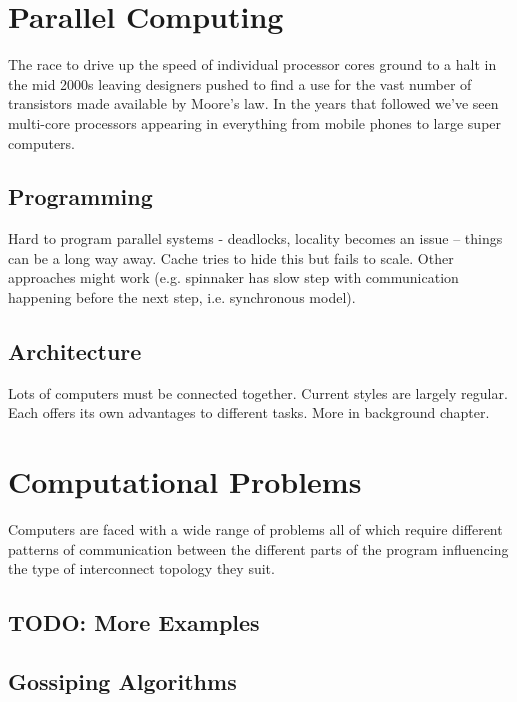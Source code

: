 	\section{Parallel Computing}
		
		The race to drive up the speed of individual processor cores ground to a
		halt in the mid 2000s leaving designers pushed to find a use for the vast
		number of transistors made available by Moore's law. In the years that
		followed we've seen multi-core processors appearing in everything from
		mobile phones to large super computers.
		
		\subsection{Programming}
			
			Hard to program parallel systems - deadlocks, locality becomes an issue --
			things can be a long way away. Cache tries to hide this but fails to
			scale. Other approaches might work (e.g. spinnaker has slow step with
			communication happening before the next step, i.e. synchronous model).
		
		\subsection{Architecture}
			
			Lots of computers must be connected together. Current styles are largely
			regular. Each offers its own advantages to different tasks. More in
			background chapter.
	
	\section{Computational Problems}
		
		Computers are faced with a wide range of problems all of which require
		different patterns of communication between the different parts of the
		program influencing the type of interconnect topology they suit.
		
		\subsection{TODO: More Examples}
		
		\subsection{Gossiping Algorithms}
			
